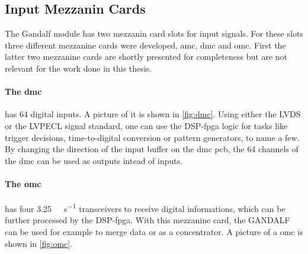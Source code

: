 \subsection{Input Mezzanin Cards}
The Gandalf module has two mezzanin card slots for input signals.
For these slots three different mezzanine cards were developed, \ac{amc}, \ac{dmc} and \ac{omc}.
First the latter two mezzanine cards are shortly presented for completeness but are not relevant for the work done in this thesis.

\paragraph{The \ac{dmc}} has 64 digital inputs. 
A picture of it is shown in \autoref{fig:dmc}.
Using either the LVDS or the LVPECL signal standard, one can use the DSP-\ac{fpga} logic for tasks like trigger decisions, time-to-digital conversion or pattern generators, to name a few.
By changing the direction of the input buffer on the \ac{dmc} \ac{pcb}, the 64 channels of the \ac{dmc} can be used as outputs intead of inputs.

\paragraph{The \ac{omc}} has four \SI{3.25}{\giga\bit\per\second} transceivers to receive digital informations, which can be further processed by the DSP-\ac{fpga}.
With this mezzanine card, the GANDALF can be used for example to merge data or as a concentrator.
A picture of a \ac{omc} is shown in \autoref{fig:omc}.

